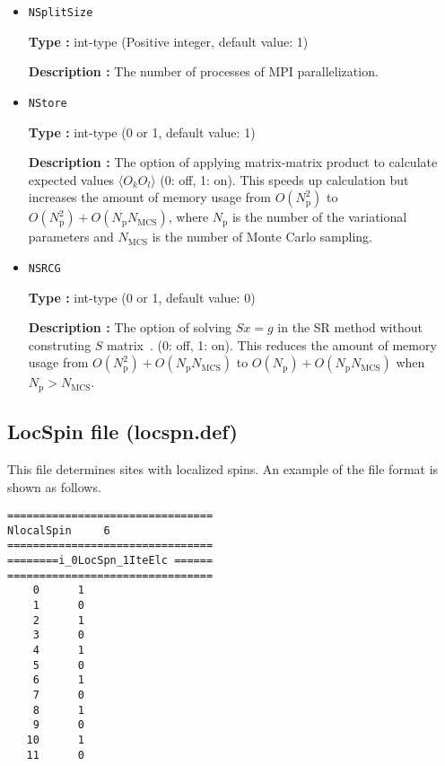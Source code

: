 \begin{itemize}
 \item \verb|NSplitSize|

{\bf Type :} int-type (Positive integer, default value: 1)

{\bf Description :} The number of processes of MPI parallelization.

\item \verb|NStore|

{\bf Type :} int-type (0 or 1, default value: 1)

{\bf Description :} The option of applying matrix-matrix product to calculate expected values $\langle O_k O_l \rangle$ (0: off, 1: on).  
This speeds up calculation but increases the amount of memory usage from $O(N_\text{p}^2)$ to $O(N_\text{p}^2) + O(N_\text{p}N_\text{MCS})$, where $N_\text{p}$ is the number of the variational parameters and $N_\text{MCS}$ is the number of Monte Carlo sampling.
\item \verb|NSRCG|

{\bf Type :} int-type (0 or 1, default value: 0)

{\bf Description :} The option of solving $Sx=g$ in the SR method without construting $S$ matrix~\cite{NeuscammanUmrigarChan}. (0: off, 1: on). This reduces the amount of memory usage from $O(N_\text{p}^2) + O(N_\text{p}N_\text{MCS})$ to $O(N_\text{p}) + O(N_\text{p}N_\text{MCS})$ when $N_\text{p} > N_\text{MCS}$.
  
 \end{itemize}


\newpage
\subsection{LocSpin file (locspn.def)}
\label{Subsec:locspn}
This file determines sites with localized spins. An example of the file format is shown as follows.\\
\begin{minipage}{10cm}
\begin{screen}
\begin{verbatim}
================================ 
NlocalSpin     6  
================================ 
========i_0LocSpn_1IteElc ====== 
================================ 
    0      1
    1      0
    2      1
    3      0
    4      1
    5      0
    6      1
    7      0
    8      1
    9      0
   10      1
   11      0
\end{verbatim}
\end{screen}
\end{minipage}


